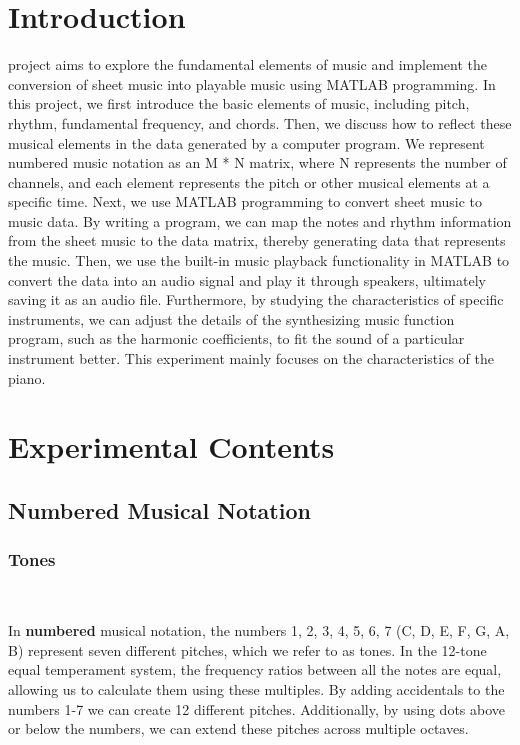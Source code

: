 \documentclass[journal]{IEEEtran}
\begin{document}
\section{Introduction}
 project aims to explore the fundamental elements of music and implement the conversion of sheet music into playable music using MATLAB programming. In this project, we first introduce the basic elements of music, including pitch, rhythm, 
fundamental frequency, and chords. Then, we discuss how to reflect these musical elements in the data generated by a computer program. We represent numbered music notation as an M * N matrix, where N represents the number of channels, and each element represents the pitch or other musical elements at a specific time. Next, we use MATLAB programming to convert sheet music to music data. By writing a program, we can map the notes and rhythm information from the sheet music to the data matrix, thereby generating data that represents the music. Then, we use the built-in music playback functionality in MATLAB to convert the data into an audio signal and play it through speakers, ultimately saving it as an audio file. Furthermore, by studying the characteristics of specific instruments, we can adjust the details of the synthesizing music function program, such as the harmonic coefficients, to fit the sound of a particular instrument better. This experiment mainly focuses on the characteristics
 of the piano.






\section{Experimental Contents}
\label{sec:guidelines}


\subsection{Numbered Musical Notation}
\subsubsection{Tones}
$~$

In \textbf{numbered} musical notation, the numbers 1, 2, 3, 4, 5, 6, 7 (C, D, E, F, G, A, B) represent seven different pitches, which we refer to as tones. In the 12-tone equal temperament system, the frequency ratios between all the notes are equal, allowing us to calculate them using these multiples. By adding accidentals to the numbers 1-7  we can create 12 different pitches. Additionally, by using dots above or below the numbers, we can extend these pitches across multiple octaves. 
\end{document}
